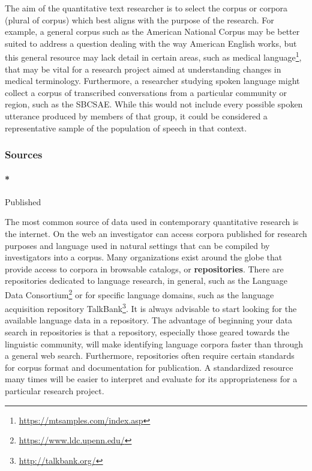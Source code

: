 \documentclass[
  letterpaper,
]{latex/krantz}
\let\oldparagraph\paragraph
\renewcommand{\paragraph}[1]{\oldparagraph{#1}\mbox{}}
\DeclareRobustCommand{\href}[2]{#2\footnote{\url{#1}}}
\begin{document}
The aim of the quantitative text researcher is to select the corpus or
corpora (plural of corpus) which best aligns with the purpose of the
research. For example, a general corpus such as the American National
Corpus may be better suited to address a question dealing with the way
American English works, but this general resource may lack detail in
certain areas, such as \href{https://mtsamples.com/index.asp}{medical
language}, that may be vital for a research project aimed at
understanding changes in medical terminology. Furthermore, a researcher
studying spoken language might collect a corpus of transcribed
conversations from a particular community or region, such as the SBCSAE.
While this would not include every possible spoken utterance produced by
members of that group, it could be considered a representative sample of
the population of speech in that context.

\hypertarget{sources}{%
\subsubsection{Sources}\label{sources}}

\hypertarget{published}{%
\paragraph*{Published}\label{published}}

The most common source of data used in contemporary quantitative
research is the internet. On the web an investigator can access corpora
published for research purposes and language used in natural settings
that can be compiled by investigators into a corpus. Many organizations
exist around the globe that provide access to corpora in browsable
catalogs, or \textbf{repositories}. There are repositories dedicated to
language research, in general, such as the
\href{https://www.ldc.upenn.edu/}{Language Data Consortium} or for
specific language domains, such as the language acquisition repository
\href{http://talkbank.org/}{TalkBank}. It is always advisable to start
looking for the available language data in a repository. The advantage
of beginning your data search in repositories is that a repository,
especially those geared towards the linguistic community, will make
identifying language corpora faster than through a general web search.
Furthermore, repositories often require certain standards for corpus
format and documentation for publication. A standardized resource many
times will be easier to interpret and evaluate for its appropriateness
for a particular research project.
\end{document}
